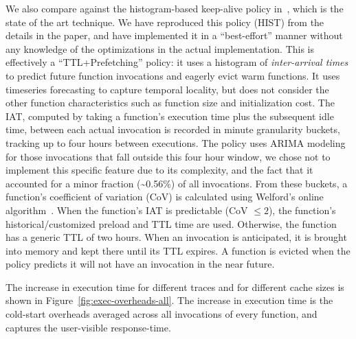 We also compare against the histogram-based keep-alive policy in~\cite{shahrad_serverless_2020}, which is the state of the art technique.
We have reproduced this policy (HIST) from the details in the paper, and have implemented it in a ``best-effort'' manner without any knowledge of the optimizations in the actual implementation.
This is effectively a ``TTL+Prefetching'' policy: it uses a histogram of \emph{inter-arrival times} to predict future function invocations and eagerly evict warm functions.
It uses timeseries forecasting to capture temporal locality, but does not consider the other function characteristics such as function size and initialization cost. 
The IAT, computed by taking a function's execution time plus the subsequent idle time, between each actual invocation is recorded in minute granularity buckets, tracking up to four hours between executions.
The policy uses ARIMA modeling for those invocations that fall outside this four hour window, we chose not to implement this specific feature due to its complexity, and the fact that it accounted for a minor fraction (\textasciitilde 0.56\%) of all invocations.
From these buckets, a function's coefficient of variation (CoV) is calculated using Welford's online algorithm~\cite{welford}. 
When the function's IAT is predictable (CoV $\leq 2$), the function's historical/customized preload and TTL time are used.
Otherwise, the function has a generic TTL of two hours. 
When an invocation is anticipated, it is brought into memory and kept there until its TTL expires.
A function is evicted when the policy predicts it will not have an invocation in the near future. 


%
The increase in execution time for different traces and for different cache sizes is shown in Figure~\ref{fig:exec-overheads-all}.
The increase in execution time is the cold-start overheads averaged across all invocations of every function, and captures the user-visible response-time. 
%

